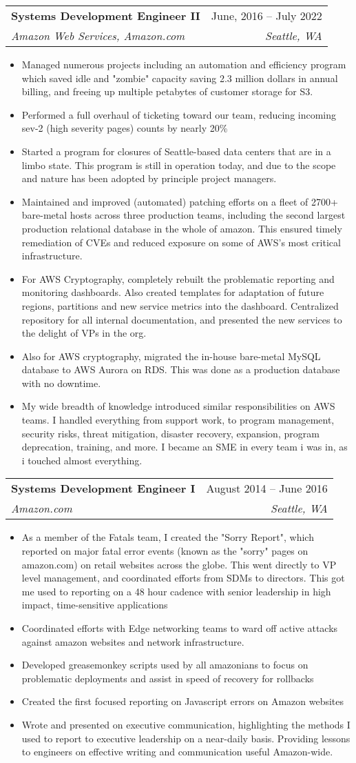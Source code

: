 \documentclass[letterpaper,11pt]{article}
\makeatletter
\newcommand{\resumeItem}[1]{
  \item\small{
    {#1 \vspace{-2pt}}
  }
}
\newcommand{\resumeSubheading}[4]{
  \vspace{-2pt}\item
    \begin{tabular*}{0.97\textwidth}[t]{l@{\extracolsep{\fill}}r}
      \textbf{#1} & #2 \\
      \textit{\small#3} & \textit{\small #4} \\
    \end{tabular*}\vspace{-7pt}
}
\newcommand{\resumeItemListStart}{\begin{itemize}}
\newcommand{\resumeItemListEnd}{\end{itemize}\vspace{-5pt}}
\makeatother
\begin{document}
    \resumeSubheading
      {Systems Development Engineer II}{June, 2016 -- July 2022}
      {Amazon Web Services, Amazon.com}{Seattle, WA}
      \resumeItemListStart
        \resumeItem{Managed numerous projects including an automation and efficiency program which saved idle and "zombie" capacity saving 2.3 million dollars in annual billing, and freeing up multiple petabytes of customer storage for S3.}
        \resumeItem{Performed a full overhaul of ticketing toward our team, reducing incoming sev-2 (high severity pages) counts by nearly 20\%}
        \resumeItem{Started a program for closures of Seattle-based data centers that are in a limbo state. This program is still in operation today, and due to the scope and nature has been adopted by principle project managers.}
        \resumeItem{Maintained and improved (automated) patching efforts on a fleet of 2700+ bare-metal hosts across three production teams, including the second largest production relational database in the whole of amazon. This ensured timely remediation of CVEs and reduced exposure on some of AWS's most critical infrastructure.}
        \resumeItem{For AWS Cryptography, completely rebuilt the problematic reporting and monitoring dashboards. Also created templates for adaptation of future regions, partitions and new service metrics into the dashboard. Centralized repository for all internal documentation, and presented the new services to the delight of VPs in the org.}
        \resumeItem{Also for AWS cryptography, migrated the in-house bare-metal MySQL database to AWS Aurora on RDS. This was done as a production database with no downtime.}
        \resumeItem{My wide breadth of knowledge introduced similar responsibilities on AWS teams. I handled everything from support work, to program management, security risks, threat mitigation, disaster recovery, expansion, program deprecation, training, and more. I became an SME in every team i was in, as i touched almost everything. }
    \resumeItemListEnd

    \resumeSubheading
      {Systems Development Engineer I}{August 2014 -- June 2016}
      {Amazon.com}{Seattle, WA}
      \resumeItemListStart
        \resumeItem{As a member of the Fatals team, I created the "Sorry Report", which reported on major fatal error events (known as the "sorry" pages on amazon.com) on retail websites across the globe. This went directly to VP level management, and coordinated efforts from SDMs to directors. This got me used to reporting on a 48 hour cadence with senior leadership in high impact, time-sensitive applications}
        \resumeItem{Coordinated efforts with Edge networking teams to ward off active attacks against amazon websites and network infrastructure.}
        \resumeItem{Developed greasemonkey scripts used by all amazonians to focus on problematic deployments and assist in speed of recovery for rollbacks}
        \resumeItem{Created the first focused reporting on Javascript errors on Amazon websites}
        \resumeItem{Wrote and presented on executive communication, highlighting the methods I used to report to executive leadership on a near-daily basis. Providing lessons to engineers on effective writing and communication useful Amazon-wide. }
      \resumeItemListEnd
\end{document}
